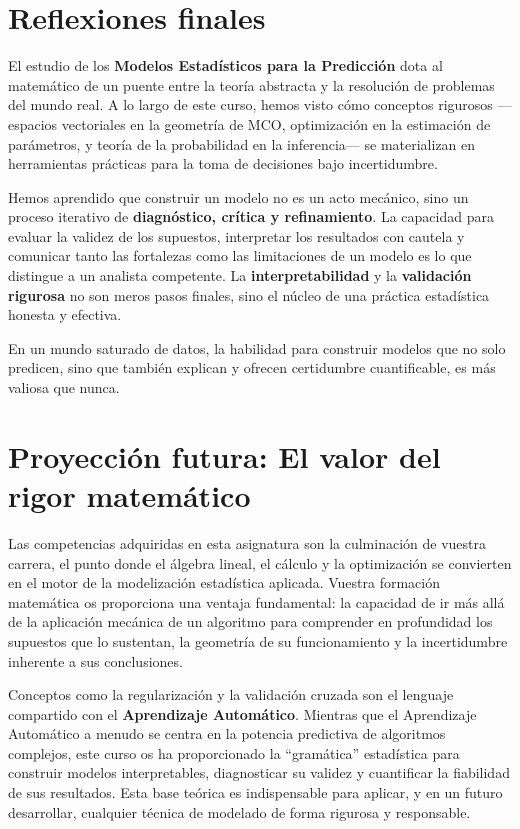 \documentclass[
  letterpaper,
  DIV=11,
  numbers=noendperiod]{scrreprt}
\begin{document}
\section{Reflexiones finales}\label{reflexiones-finales}

El estudio de los \textbf{Modelos Estadísticos para la Predicción} dota
al matemático de un puente entre la teoría abstracta y la resolución de
problemas del mundo real. A lo largo de este curso, hemos visto cómo
conceptos rigurosos ---espacios vectoriales en la geometría de MCO,
optimización en la estimación de parámetros, y teoría de la probabilidad
en la inferencia--- se materializan en herramientas prácticas para la
toma de decisiones bajo incertidumbre.

Hemos aprendido que construir un modelo no es un acto mecánico, sino un
proceso iterativo de \textbf{diagnóstico, crítica y refinamiento}. La
capacidad para evaluar la validez de los supuestos, interpretar los
resultados con cautela y comunicar tanto las fortalezas como las
limitaciones de un modelo es lo que distingue a un analista competente.
La \textbf{interpretabilidad} y la \textbf{validación rigurosa} no son
meros pasos finales, sino el núcleo de una práctica estadística honesta
y efectiva.

En un mundo saturado de datos, la habilidad para construir modelos que
no solo predicen, sino que también explican y ofrecen certidumbre
cuantificable, es más valiosa que nunca.

\section{Proyección futura: El valor del rigor
matemático}\label{proyecciuxf3n-futura-el-valor-del-rigor-matemuxe1tico}

Las competencias adquiridas en esta asignatura son la culminación de
vuestra carrera, el punto donde el álgebra lineal, el cálculo y la
optimización se convierten en el motor de la modelización estadística
aplicada. Vuestra formación matemática os proporciona una ventaja
fundamental: la capacidad de ir más allá de la aplicación mecánica de un
algoritmo para comprender en profundidad los supuestos que lo sustentan,
la geometría de su funcionamiento y la incertidumbre inherente a sus
conclusiones.

Conceptos como la regularización y la validación cruzada son el lenguaje
compartido con el \textbf{Aprendizaje Automático}. Mientras que el
Aprendizaje Automático a menudo se centra en la potencia predictiva de
algoritmos complejos, este curso os ha proporcionado la ``gramática''
estadística para construir modelos interpretables, diagnosticar su
validez y cuantificar la fiabilidad de sus resultados. Esta base teórica
es indispensable para aplicar, y en un futuro desarrollar, cualquier
técnica de modelado de forma rigurosa y responsable.
\end{document}
